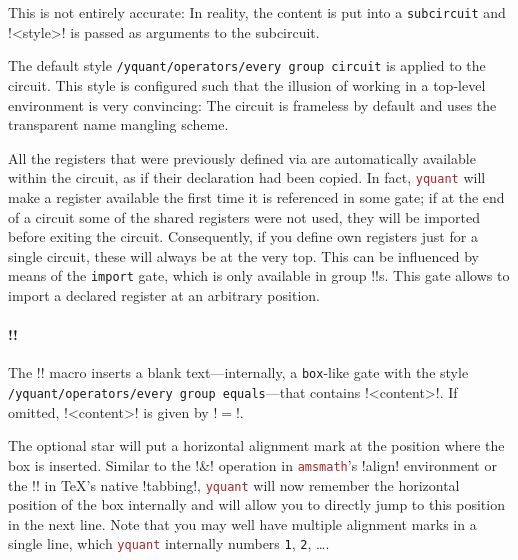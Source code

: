\documentclass{scrartcl}
\def\pkg#1{\textcolor{brown}{\texttt{#1}}}
\def\ttlink{\link\texttt}
\def\texlink{\link\tex}
\def\Yquant{\pkg{yquant}}
\begin{document}
               This is not entirely accurate: In reality, the content is put into a \ttlink{subcircuit} and \tex!<style>! is passed as arguments to the subcircuit.

               The default style \ttlink{/yquant/operators/every group circuit} is applied to the circuit.
               This style is configured such that the illusion of working in a top\hyp level \texlink{yquant} environment is very convincing: The circuit is frameless by default and uses the transparent name mangling scheme.

               All the registers that were previously defined via \texlink[groups/registers]{\registers} are automatically available within the circuit, as if their declaration had been copied.
               In fact, \Yquant{} will make a register available the first time it is referenced in some gate; if at the end of a circuit some of the shared registers were not used, they will be imported before exiting the circuit.
               Consequently, if you define own registers just for a single circuit, these will always be at the very top.
               This can be influenced by means of the \ttlink{import} gate, which is only available in group \tex!\circuit!s.
               This gate allows to import a declared register at an arbitrary position.

            \paragraph*{\tex!\equals*[<content>]!}\label{sec:foreign:groups:equals}
               The \tex!\equals! macro inserts a blank text---internally, a \ttlink{box}\hyp like gate with the style \ttlink{/yquant/operators/every group equals}---that contains \tex!<content>!.
               If omitted, \tex!<content>! is given by \tex!$=$!.

               The optional star will put a horizontal alignment mark at the position where the box is inserted.
               Similar to the \tex!&! operation in \pkg{amsmath}'s \tex!align! environment or the \tex!\>! in \TeX's native \tex!tabbing!, \Yquant{} will now remember the horizontal position of the box internally and will allow you to directly jump to this position in the next line.
               Note that you may well have multiple alignment marks in a single line, which \Yquant{} internally numbers \texttt{1}, \texttt{2}, \dots.
\end{document}
